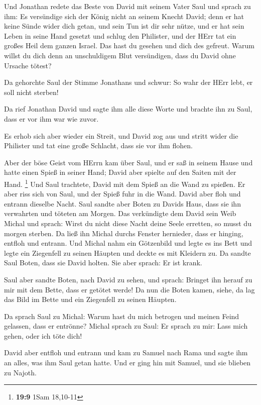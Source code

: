  Und Jonathan redete das Beste von David mit seinem Vater
Saul und sprach zu ihm: Es versündige sich der König nicht an seinem
Knecht David; denn er hat keine Sünde wider dich getan, und sein Tun ist
dir sehr nütze,  und er hat sein Leben in seine Hand gesetzt
und schlug den Philister, und der HErr tat ein großes Heil dem ganzen
Israel. Das hast du gesehen und dich des gefreut. Warum willst du dich
denn an unschuldigem Blut versündigen, dass du David ohne Ursache
tötest?

 Da gehorchte Saul der Stimme Jonathans und schwur: So wahr
der HErr lebt, er soll nicht sterben!

 Da rief Jonathan David und sagte ihm alle diese Worte und
brachte ihn zu Saul, dass er vor ihm war wie zuvor.

 Es erhob sich aber wieder ein Streit, und David zog aus und
stritt wider die Philister und tat eine große Schlacht, dass sie vor ihm
flohen.

 Aber der böse Geist vom HErrn kam über Saul, und er saß in
seinem Hause und hatte einen Spieß in seiner Hand; David aber spielte
auf den Saiten mit der Hand. \footnote{\textbf{19:9} 1Sam 18,10-11}
 Und Saul trachtete, David mit dem Spieß an die Wand zu
spießen. Er aber riss sich von Saul, und der Spieß fuhr in die Wand.
David aber floh und entrann dieselbe Nacht.  Saul sandte
aber Boten zu Davids Haus, dass sie ihn verwahrten und töteten am
Morgen. Das verkündigte dem David sein Weib Michal und sprach: Wirst du
nicht diese Nacht deine Seele erretten, so musst du morgen sterben.
 Da ließ ihn Michal durchs Fenster hernieder, dass er
hinging, entfloh und entrann.  Und Michal nahm ein
Götzenbild und legte es ins Bett und legte ein Ziegenfell zu seinen
Häupten und deckte es mit Kleidern zu.  Da sandte Saul
Boten, dass sie David holten. Sie aber sprach: Er ist krank.

 Saul aber sandte Boten, nach David zu sehen, und sprach:
Bringet ihn herauf zu mir mit dem Bette, dass er getötet werde!
 Da nun die Boten kamen, siehe, da lag das Bild im Bette
und ein Ziegenfell zu seinen Häupten.

 Da sprach Saul zu Michal: Warum hast du mich betrogen und
meinen Feind gelassen, dass er entrönne? Michal sprach zu Saul: Er
sprach zu mir: Lass mich gehen, oder ich töte dich!

 David aber entfloh und entrann und kam zu Samuel nach Rama
und sagte ihm an alles, was ihm Saul getan hatte. Und er ging hin mit
Samuel, und sie blieben zu Najoth.

